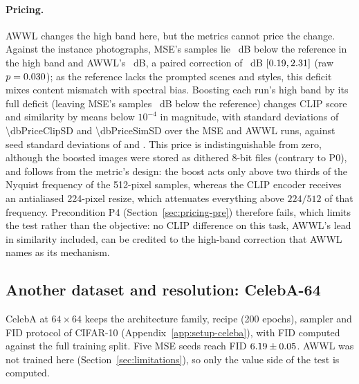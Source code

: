 \paragraph{Pricing.} AWWL changes the high band here, but the metrics cannot
price the change. Against the instance photographs, MSE's samples lie
\dbDefMSE~dB below the reference in the high band and AWWL's \dbDefAWWL~dB, a
paired correction of \dbCorr~dB $[0.19, 2.31]$ (raw
$p = 0.030$); as the reference lacks the prompted scenes and styles, this
deficit mixes content mismatch with spectral bias. Boosting each run's high
band by its full deficit (leaving MSE's samples \dbResid~dB below the
reference) changes CLIP score and similarity by means below $10^{-4}$ in
magnitude, with standard deviations of
\num[exponent-mode=scientific]{\dbPriceClipSD} and
\num[exponent-mode=scientific]{\dbPriceSimSD} over the \dbPriceClipN{} MSE
and AWWL runs, against seed standard deviations of \dbSeedSDClip{} and
\dbSeedSDSim{}. This price is indistinguishable from zero, although the
boosted images were stored as dithered 8-bit files (contrary to P0), and
follows from the metric's design: the boost acts only above two thirds of the
Nyquist frequency of the 512-pixel samples, whereas the CLIP encoder receives
an antialiased 224-pixel resize, which attenuates everything above $224/512$
of that frequency.
Precondition P4 (Section~\ref{sec:pricing-pre}) therefore fails, which
limits the test rather than the objective: no CLIP difference on this task,
AWWL's lead in similarity included, can be credited to the high-band
correction that AWWL names as its mechanism.

\subsection{Another dataset and resolution: CelebA-64}
\label{sec:celeba}

CelebA \citep{liu2015deep} at $64\times64$ keeps the architecture family,
recipe (200 epochs), sampler and FID protocol of CIFAR-10
(Appendix~\ref{app:setup-celeba}), with FID computed against the full training
split. Five MSE seeds reach FID $6.19 \pm 0.05$. AWWL
was not trained here (Section~\ref{sec:limitations}), so only the value side
of the test is computed.

